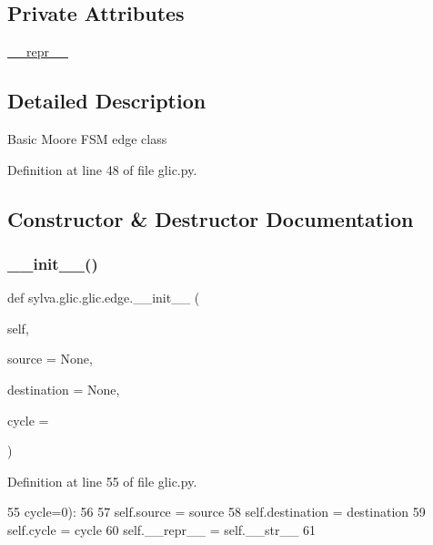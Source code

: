 \subsection*{Private Attributes}
\begin{DoxyCompactItemize}
\item 
\hyperlink{classsylva_1_1glic_1_1glic_1_1edge_a30be603f8a2b6d9c9cc2da06ce2444c1}{\+\_\+\+\_\+repr\+\_\+\+\_\+}
\end{DoxyCompactItemize}


\subsection{Detailed Description}
\begin{DoxyVerb}  Basic Moore FSM edge class
\end{DoxyVerb}
 

Definition at line 48 of file glic.\+py.



\subsection{Constructor \& Destructor Documentation}
\mbox{\label{classsylva_1_1glic_1_1glic_1_1edge_a457302dcf6988c35a0dc6eb4910700d5}} 
\subsubsection{\texorpdfstring{\+\_\+\+\_\+init\+\_\+\+\_\+()}{\_\_init\_\_()}}
{\footnotesize\ttfamily def sylva.\+glic.\+glic.\+edge.\+\_\+\+\_\+init\+\_\+\+\_\+ (\begin{DoxyParamCaption}\item[{}]{self,  }\item[{}]{source = {\ttfamily None},  }\item[{}]{destination = {\ttfamily None},  }\item[{}]{cycle = {} }\end{DoxyParamCaption})}



Definition at line 55 of file glic.\+py.


\begin{DoxyCode}
55                      cycle=0):
56 
57             self.source = source
58             self.destination = destination
59             self.cycle = cycle
60             self.\_\_repr\_\_ = self.\_\_str\_\_
61 
\end{DoxyCode}


